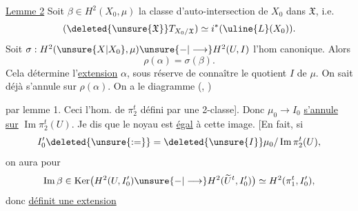\uline{Lemme 2} Soit $\beta\in H^2(X_0,\mu)$ la classe d'auto-intersection
de $X_0$ dans $\mathfrak X$, i.e.
\[
(\deleted{\unsure{\mathfrak X}}T_{X_0/\mathfrak X})
\simeq i^*(\uline{L}(X_0)).
\]
Soit $\sigma:H^2(\unsure{X|X_0},\mu)\unsure{-|\longrightarrow}H^2(U,I)$
l'hom canonique.
Alors
\[
\rho(\alpha)=\sigma(\beta).
\]
Cela détermine l'\uline{extension} $\alpha$, sous
réserve de connaître le quotient $I$ de $\mu$.
On sait déjà 
\deleted{\unsure{$\rho\beta$}}
s'annule sur $\rho(\alpha)$. On a le diagramme
(, )

par lemme 1. Ceci  l'hom.
 de $\pi_2^t$ défini par une 2-classe].
Donc 
$\mu_0\longrightarrow I_0$ \uline{s'annule sur}
$\operatorname{Im}\pi_2^t(U)$. Je dis que 
le noyau est \uline{égal} à cette image.
[En fait, si
\[
I'_0\deleted{\unsure{:=}}=\deleted{\unsure{I}}
\mu_0/\operatorname{Im}\pi_2^t(U),
\]
on aura pour
\[
\operatorname{Im}\beta\in
\operatorname{Ker}\bigl(H^2(U,I'_0)\unsure{-|\longrightarrow}
H^2(\widetilde U^t,I'_0)\bigr)
\simeq H^2(\pi_1^t,I'_0),
\]
donc 
\uline{définit une extension}
